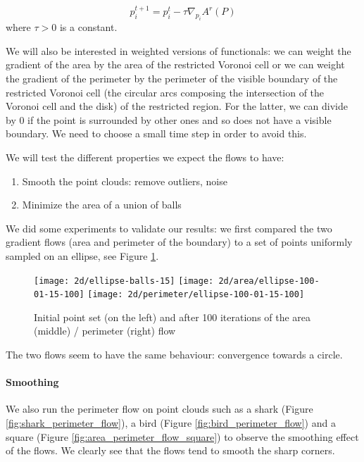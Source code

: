 \begin{equation}
    p_i^{t+1} = p_i^t - \tau \nabla_{p_i} A^r(P)
\end{equation}
where $ \tau > 0 $ is a constant.

We will also be interested in weighted versions of functionals: we can weight
the gradient of the area by the area of the restricted Voronoi cell or we can
weight the gradient of the perimeter by the perimeter of the visible boundary of
the restricted Voronoi cell (the circular arcs composing the intersection of the
Voronoi cell and the disk) of the restricted region. For the latter, we can
divide by $ 0 $ if the point is surrounded by other ones and so does not have a
visible boundary. We need to choose a small time step in order to avoid this.

We will test the different properties we expect the flows to have:
\begin{enumerate}
    \item Smooth the point clouds: remove outliers, noise
    \item Minimize the area of a union of balls
\end{enumerate}

We did some experiments to validate our results: we first compared the two
gradient flows (area and perimeter of the boundary) to a set of points uniformly
sampled on an ellipse, see Figure \ref{fig:ellipse_flows}.

\begin{figure}[h]
    \centering

    \texttt{[image: 2d/ellipse-balls-15]}
    \texttt{[image: 2d/area/ellipse-100-01-15-100]}
    \texttt{[image: 2d/perimeter/ellipse-100-01-15-100]}
    \caption{Initial point set (on the left) and after 100 iterations of the
        area (middle) / perimeter (right) flow}
    \label{fig:ellipse_flows}
\end{figure}

The two flows seem to have the same behaviour: convergence towards a circle.

\paragraph{Smoothing}

We also run the perimeter flow on point clouds such as a shark (Figure
\ref{fig:shark_perimeter_flow}), a bird (Figure \ref{fig:bird_perimeter_flow})
and a square (Figure \ref{fig:area_perimeter_flow_square}) to observe the
smoothing effect of the flows. We clearly see that the flows tend to smooth the sharp corners.

